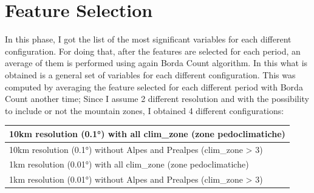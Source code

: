 \section{Feature Selection}
In this phase, I got the list of the most significant variables for each different configuration.
For doing that, after the features are selected for each period, an average of them is performed using again Borda Count algorithm. In this what is obtained is a general set of variables for each different configuration.
This was computed by averaging the feature selected for each different period with Borda Count another time;
Since I assume 2 different resolution and with the possibility to include or not the mountain zones, I obtained 4 different configurations:
\begin{table}[H]
    \centering
    \begin{tabular}{|l|}
    \hline
        10km resolution (0.1°) with all clim\_zone (zone pedoclimatiche)  \\ \hline
        10km resolution (0.1°) without Alpes and Prealpes (clim\_zone > 3) \\ \hline
        1km resolution (0.01°) with all clim\_zone (zone pedoclimatiche)   \\ \hline
        1km resolution (0.01°) without Alpes and Prealpes (clim\_zone > 3)  \\ \hline
 
    \end{tabular}
\end{table}



